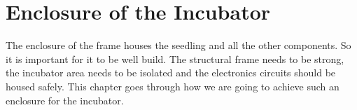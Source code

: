 \documentclass[../main]{subfiles}
\begin{document}
\chapter{Enclosure of the Incubator} \label{chp:}

The enclosure of the frame houses the seedling and all the other components. So it
is important for it to be well build. The structural frame needs to be strong,
the incubator area needs to be isolated and the electronics circuits should be
housed safely. This chapter goes through how we are going to achieve such an enclosure
for the incubator.






\end{document}
